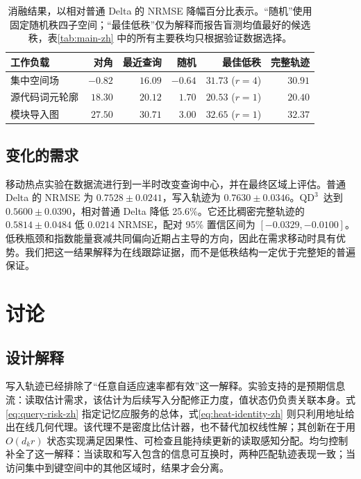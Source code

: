 \documentclass[11pt,a4paper]{ctexart}
\newcommand{\QDDD}{\ensuremath{\mathrm{QD}^{3}}}
\begin{document}
\begin{table}[t]
\caption{消融结果，以相对普通 Delta 的 NRMSE 降幅百分比表示。“随机”使用固定随机秩四子空间；“最佳低秩”仅为解释而报告盲测均值最好的候选秩，表\ref{tab:main-zh} 中的所有主要秩均只根据验证数据选择。}
\label{tab:ablation-zh}
\centering
\small
\begin{tabular}{lrrrrr}
\toprule
工作负载 & 对角 & 最近查询 & 随机 & 最佳低秩 & 完整轨迹 \\
\midrule
集中空间场 & $-0.82$ & $16.09$ & $-0.64$ & $31.73$ ($r=4$) & $30.91$ \\
源代码词元轮廓 & $18.30$ & $20.12$ & $1.70$ & $20.53$ ($r=1$) & $20.40$ \\
模块导入图 & $27.50$ & $30.71$ & $3.00$ & $32.65$ ($r=1$) & $32.37$ \\
\bottomrule
\end{tabular}
\end{table}

\subsection{变化的需求}

移动热点实验在数据流进行到一半时改变查询中心，并在最终区域上评估。普通 Delta 的 NRMSE 为 $0.7528\pm0.0241$，写入轨迹为 $0.7630\pm0.0346$。\QDDD\ 达到 $0.5600\pm0.0390$，相对普通 Delta 降低 25.6\%。它还比稠密完整轨迹的 $0.5814\pm0.0484$ 低 $0.0214$ NRMSE，配对 95\% 置信区间为 $[-0.0329,-0.0100]$。低秩瓶颈和指数能量衰减共同偏向近期占主导的方向，因此在需求移动时具有优势。我们把这一结果解释为在线跟踪证据，而不是低秩结构一定优于完整矩的普遍保证。

\section{讨论}\label{sec:discussion-zh}

\subsection{设计解释}

写入轨迹已经排除了“任意自适应速率都有效”这一解释。实验支持的是预期信息流：读取估计需求，该估计为后续写入分配修正力度，值状态仍负责关联本身。式\eqref{eq:query-risk-zh} 指定记忆应服务的总体，式\eqref{eq:heat-identity-zh} 则只利用地址给出在线几何代理。该代理不是密度比估计器，也不替代加权线性解；其创新在于用 $O(d_kr)$ 状态实现满足因果性、可检查且能持续更新的读取感知分配。均匀控制补全了这一解释：当读取和写入包含的信息可互换时，两种匹配轨迹表现一致；当访问集中到键空间中的其他区域时，结果才会分离。
\end{document}
